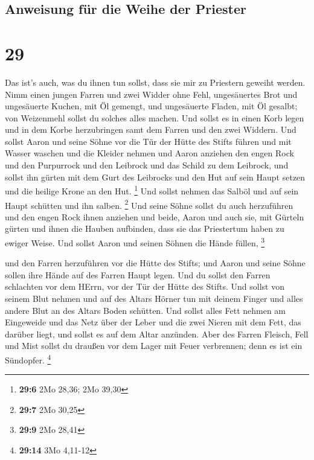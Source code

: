 \hypertarget{anweisung-fuxfcr-die-weihe-der-priester}{%
\subsection{Anweisung für die Weihe der
Priester}\label{anweisung-fuxfcr-die-weihe-der-priester}}

\hypertarget{section-28}{%
\section{29}\label{section-28}}

 Das ist's auch, was du ihnen tun sollst, dass sie mir zu
Priestern geweiht werden. Nimm einen jungen Farren und zwei Widder ohne
Fehl,  ungesäuertes Brot und ungesäuerte Kuchen, mit Öl
gemengt, und ungesäuerte Fladen, mit Öl gesalbt; von Weizenmehl sollst
du solches alles machen.  Und sollst es in einen Korb
legen und in dem Korbe herzubringen samt dem Farren und den zwei
Widdern.  Und sollst Aaron und seine Söhne vor die Tür der
Hütte des Stifts führen und mit Wasser waschen  und die
Kleider nehmen und Aaron anziehen den engen Rock und den Purpurrock und
den Leibrock und das Schild zu dem Leibrock, und sollst ihn gürten mit
dem Gurt des Leibrocks  und den Hut auf sein Haupt setzen
und die heilige Krone an den Hut. \footnote{\textbf{29:6} 2Mo 28,36; 2Mo
  39,30}  Und sollst nehmen das Salböl und auf sein Haupt
schütten und ihn salben. \footnote{\textbf{29:7} 2Mo 30,25}
 Und seine Söhne sollst du auch herzuführen und den engen
Rock ihnen anziehen  und beide, Aaron und auch sie, mit
Gürteln gürten und ihnen die Hauben aufbinden, dass sie das Priestertum
haben zu ewiger Weise. Und sollst Aaron und seinen Söhnen die Hände
füllen, \footnote{\textbf{29:9} 2Mo 28,41}

 und den Farren herzuführen vor die Hütte des Stifts; und
Aaron und seine Söhne sollen ihre Hände auf des Farren Haupt legen.
 Und du sollst den Farren schlachten vor dem HErrn, vor
der Tür der Hütte des Stifts.  Und sollst von seinem Blut
nehmen und auf des Altars Hörner tun mit deinem Finger und alles andere
Blut an des Altars Boden schütten.  Und sollst alles Fett
nehmen am Eingeweide und das Netz über der Leber und die zwei Nieren mit
dem Fett, das darüber liegt, und sollst es auf dem Altar anzünden.
 Aber des Farren Fleisch, Fell und Mist sollst du draußen
vor dem Lager mit Feuer verbrennen; denn es ist ein Sündopfer.
\footnote{\textbf{29:14} 3Mo 4,11-12}


